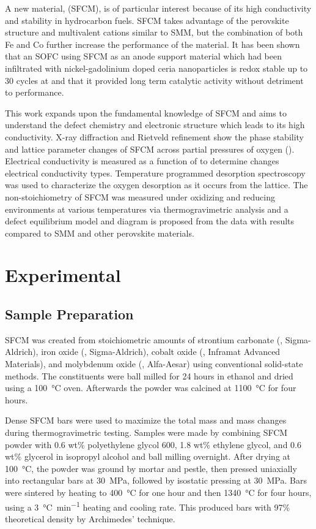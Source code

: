     A new material,  (SFCM), is of particular interest because of its high conductivity and stability in hydrocarbon fuels.\cite{Pan}
    SFCM takes advantage of the perovskite structure and multivalent cations similar to SMM, but the combination of both Fe and Co further increase the performance of the material.
    It has been shown that an SOFC using SFCM as an anode support material which had been infiltrated with nickel-gadolinium doped ceria nanoparticles is redox stable up to 30 cycles at  and that it provided long term catalytic activity without detriment to performance.\cite{Hussaina,Hussain}

    This work expands upon the fundamental knowledge of SFCM and aims to understand the defect chemistry and electronic structure which leads to its high conductivity.
    X-ray diffraction and Rietveld refinement show the phase stability and lattice parameter changes of SFCM across partial pressures of oxygen ().
    Electrical conductivity is measured as a function of  to determine changes electrical conductivity types.
    Temperature programmed desorption spectroscopy was used to characterize the oxygen desorption as it occurs from the lattice.
    The non-stoichiometry of SFCM was measured under oxidizing and reducing environments at various temperatures via thermogravimetric analysis and a defect equilibrium model and diagram is proposed from the data with results compared to SMM and other perovskite materials.

\section{Experimental}
    \subsection{Sample Preparation}
        SFCM was created from stoichiometric amounts of strontium carbonate (, Sigma-Aldrich), iron oxide (, Sigma-Aldrich), cobalt oxide (, Inframat Advanced Materials), and molybdenum oxide (, Alfa-Aesar) using conventional solid-state methods.
        The constituents were ball milled for 24 hours in ethanol and dried using a \SI{100}{\celsius} oven.
        Afterwards the powder was calcined at \SI{1100}{\celsius} for four hours.

        Dense SFCM bars were used to maximize the total mass and mass changes during thermogravimetric testing.
        Samples were made by combining SFCM powder with 0.6 wt\% polyethylene glycol 600, 1.8 wt\% ethylene glycol, and 0.6 wt\% glycerol in isopropyl alcohol and ball milling overnight.
        After drying at \SI{100}{\celsius}, the powder was ground by mortar and pestle, then pressed uniaxially into rectangular bars at \SI{30}{\mega\pascal}, followed by isostatic pressing at \SI{30}{\mega\pascal}.
        Bars were sintered by heating to \SI{400}{\celsius} for one hour and then \SI{1340}{\celsius} for four hours, using a \SI{3}{\celsius\per\minute} heating and cooling rate.
        This produced bars with 97\% theoretical density by Archimedes' technique.

